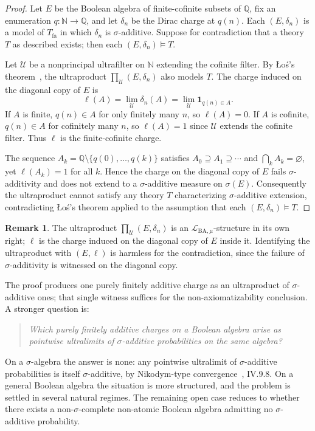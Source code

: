 \documentclass[preprint,12pt]{elsarticle}
\theoremstyle{definition}
\newtheorem{remark}[proposition]{Remark}
\newcommand{\Lmu}{\mathcal{L}_{\mathrm{BA},\mu}}
\newcommand{\Tfa}{T_{\mathrm{fa}}}
\newcommand{\Q}{\mathbb{Q}}
\newcommand{\N}{\mathbb{N}}
\begin{document}
\begin{proof}
Let $E$ be the Boolean algebra of finite-cofinite subsets of $\Q$, fix an
enumeration $q : \N \to \Q$, and let $\delta_n$ be the Dirac charge at
$q(n)$.  Each $(E, \delta_n)$ is a model of $\Tfa$ in which $\delta_n$ is
$\sigma$-additive.  Suppose for contradiction that a theory $T$ as described
exists; then each $(E, \delta_n) \models T$.

Let $\mathcal{U}$ be a nonprincipal ultrafilter on $\N$ extending the cofinite
filter.  By \L{}o\'{s}'s theorem~\cite{Los1955}, the ultraproduct
$\prod_\mathcal{U}(E,\delta_n)$ also models $T$.  The charge induced on the
diagonal copy of $E$ is
\[
  \ell(A) = \lim_\mathcal{U} \delta_n(A) = \lim_\mathcal{U} \mathbf{1}_{q(n) \in A}.
\]
If $A$ is finite, $q(n) \in A$ for only finitely many $n$, so $\ell(A) = 0$.
If $A$ is cofinite, $q(n) \in A$ for cofinitely many $n$, so $\ell(A) = 1$
since $\mathcal{U}$ extends the cofinite filter.  Thus $\ell$ is the
finite-cofinite charge.

The sequence $A_k = \Q \setminus \{q(0), \ldots, q(k)\}$ satisfies
$A_0 \supseteq A_1 \supseteq \cdots$ and $\bigcap_k A_k = \varnothing$, yet
$\ell(A_k) = 1$ for all $k$.  Hence the charge on the diagonal copy of $E$
fails $\sigma$-additivity and does not extend to a $\sigma$-additive measure
on $\sigma(E)$.  Consequently the ultraproduct cannot satisfy any theory $T$
characterizing $\sigma$-additive extension, contradicting \L{}o\'{s}'s theorem
applied to the assumption that each $(E, \delta_n) \models T$.
\end{proof}

\begin{remark}
The ultraproduct $\prod_\mathcal{U}(E,\delta_n)$ is an $\Lmu$-structure in its own
right; $\ell$ is the charge induced on the diagonal copy of $E$ inside it.
Identifying the ultraproduct with $(E,\ell)$ is harmless for the contradiction,
since the failure of $\sigma$-additivity is witnessed on the diagonal copy.
\end{remark}

\medskip

The proof produces one purely finitely additive charge as an ultraproduct of
$\sigma$-additive ones; that single witness suffices for the non-axiomatizability
conclusion.  A stronger question is:

\begin{quote}
\itshape
Which purely finitely additive charges on a Boolean algebra arise as pointwise
ultralimits of $\sigma$-additive probabilities on the same algebra?
\end{quote}

\noindent On a $\sigma$-algebra the answer is none: any pointwise ultralimit of
$\sigma$-additive probabilities is itself $\sigma$-additive, by Nikodym-type
convergence~\cite{DunfordSchwartz1958}, IV.9.8.  On a general Boolean algebra the
situation is more structured, and the problem is settled in several natural regimes.
The remaining open case reduces to whether there exists a non-$\sigma$-complete
non-atomic Boolean algebra admitting no $\sigma$-additive probability.



\end{document}
